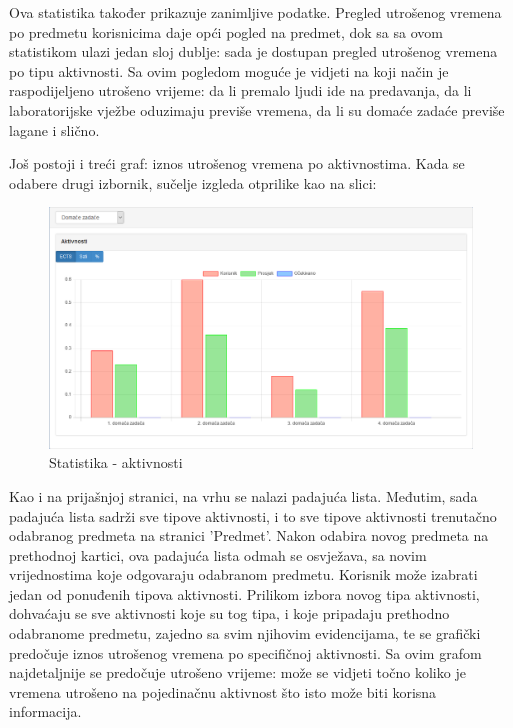 \documentclass[times, utf8, zavrsni]{fer}
\begin{document}
Ova statistika također prikazuje zanimljive podatke. Pregled utrošenog vremena po predmetu korisnicima daje opći pogled na predmet, dok sa sa ovom statistikom ulazi jedan sloj dublje: sada je dostupan pregled utrošenog vremena po tipu aktivnosti. Sa ovim pogledom moguće je vidjeti na koji način je raspodijeljeno utrošeno vrijeme: da li premalo ljudi ide na predavanja, da li laboratorijske vježbe oduzimaju previše vremena, da li su domaće zadaće previše lagane i slično.

Još postoji i treći graf: iznos utrošenog vremena po aktivnostima. Kada se odabere drugi izbornik, sučelje izgleda otprilike kao na slici:

\begin{figure}[H]
\centering
\includegraphics[width=\textwidth,height=\textheight,keepaspectratio]{img/statistika-aktivnosti.png}
\caption{Statistika - aktivnosti}
\label{fig:statistika-aktivnosti}
\end{figure}

Kao i na prijašnjoj stranici, na vrhu se nalazi padajuća lista. Međutim, sada padajuća lista sadrži sve tipove aktivnosti, i to sve tipove aktivnosti trenutačno odabranog predmeta na stranici 'Predmet'. Nakon odabira novog predmeta na prethodnoj kartici, ova padajuća lista odmah se osvježava, sa novim vrijednostima koje odgovaraju odabranom predmetu. Korisnik može izabrati jedan od ponuđenih tipova aktivnosti. Prilikom izbora novog tipa aktivnosti, dohvaćaju se sve aktivnosti koje su tog tipa, i koje pripadaju prethodno odabranome predmetu, zajedno sa svim njihovim evidencijama, te se grafički predočuje iznos utrošenog vremena po specifičnoj aktivnosti. Sa ovim grafom najdetaljnije se predočuje utrošeno vrijeme: može se vidjeti točno koliko je vremena utrošeno na pojedinačnu aktivnost što isto može biti korisna informacija.
\end{document}
